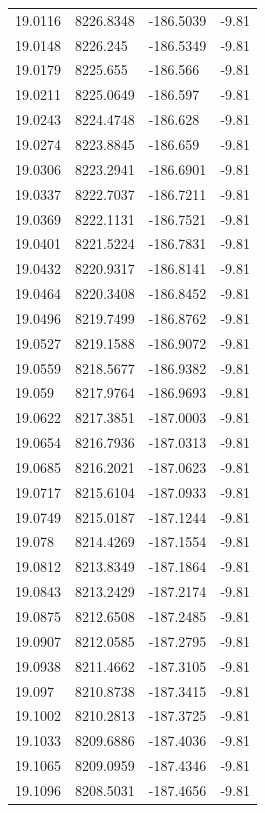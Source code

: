 \begin{table}[H]
\begin{tabular}{llll}
19.0116 & 8226.8348 & -186.5039 & -9.81 \\
19.0148 & 8226.245 & -186.5349 & -9.81 \\
19.0179 & 8225.655 & -186.566 & -9.81 \\
19.0211 & 8225.0649 & -186.597 & -9.81 \\
19.0243 & 8224.4748 & -186.628 & -9.81 \\
19.0274 & 8223.8845 & -186.659 & -9.81 \\
19.0306 & 8223.2941 & -186.6901 & -9.81 \\
19.0337 & 8222.7037 & -186.7211 & -9.81 \\
19.0369 & 8222.1131 & -186.7521 & -9.81 \\
19.0401 & 8221.5224 & -186.7831 & -9.81 \\
19.0432 & 8220.9317 & -186.8141 & -9.81 \\
19.0464 & 8220.3408 & -186.8452 & -9.81 \\
19.0496 & 8219.7499 & -186.8762 & -9.81 \\
19.0527 & 8219.1588 & -186.9072 & -9.81 \\
19.0559 & 8218.5677 & -186.9382 & -9.81 \\
19.059 & 8217.9764 & -186.9693 & -9.81 \\
19.0622 & 8217.3851 & -187.0003 & -9.81 \\
19.0654 & 8216.7936 & -187.0313 & -9.81 \\
19.0685 & 8216.2021 & -187.0623 & -9.81 \\
19.0717 & 8215.6104 & -187.0933 & -9.81 \\
19.0749 & 8215.0187 & -187.1244 & -9.81 \\
19.078 & 8214.4269 & -187.1554 & -9.81 \\
19.0812 & 8213.8349 & -187.1864 & -9.81 \\
19.0843 & 8213.2429 & -187.2174 & -9.81 \\
19.0875 & 8212.6508 & -187.2485 & -9.81 \\
19.0907 & 8212.0585 & -187.2795 & -9.81 \\
19.0938 & 8211.4662 & -187.3105 & -9.81 \\
19.097 & 8210.8738 & -187.3415 & -9.81 \\
19.1002 & 8210.2813 & -187.3725 & -9.81 \\
19.1033 & 8209.6886 & -187.4036 & -9.81 \\
19.1065 & 8209.0959 & -187.4346 & -9.81 \\
19.1096 & 8208.5031 & -187.4656 & -9.81 \\

\end{tabular}
\end{table}

